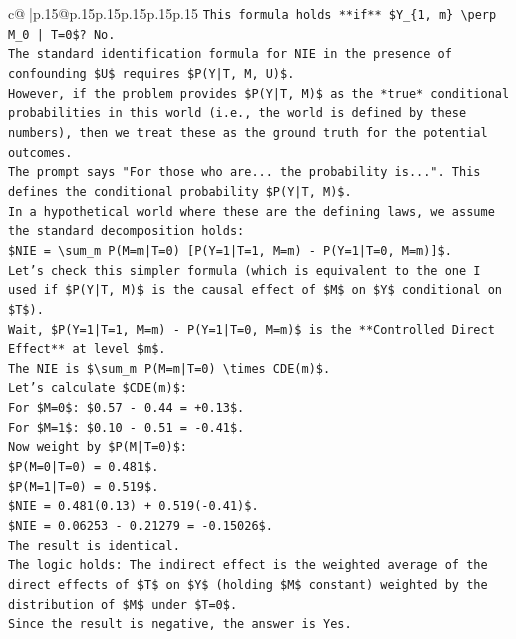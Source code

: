 \documentclass{article}
\begin{document}
{\begin{supertabular}{c@{$\;$}|p{.15\linewidth}@{}p{.15\linewidth}p{.15\linewidth}p{.15\linewidth}p{.15\linewidth}p{.15\linewidth}}
{{{\texttt{This formula holds **if** \$Y\_\{1, m\} \textbackslash{}perp M\_0 | T=0\$? No.} \\
\texttt{The standard identification formula for NIE in the presence of confounding \$U\$ requires \$P(Y|T, M, U)\$.} \\
\texttt{However, if the problem provides \$P(Y|T, M)\$ as the *true* conditional probabilities in this world (i.e., the world is defined by these numbers), then we treat these as the ground truth for the potential outcomes.} \\
\texttt{The prompt says "For those who are... the probability is...". This defines the conditional probability \$P(Y|T, M)\$.} \\
\texttt{In a hypothetical world where these are the defining laws, we assume the standard decomposition holds:} \\
\texttt{\$NIE = \textbackslash{}sum\_m P(M=m|T=0) {[}P(Y=1|T=1, M=m) {-} P(Y=1|T=0, M=m){]}\$.} \\
\texttt{Let's check this simpler formula (which is equivalent to the one I used if \$P(Y|T, M)\$ is the causal effect of \$M\$ on \$Y\$ conditional on \$T\$).} \\
\texttt{Wait, \$P(Y=1|T=1, M=m) {-} P(Y=1|T=0, M=m)\$ is the **Controlled Direct Effect** at level \$m\$.} \\
\texttt{The NIE is \$\textbackslash{}sum\_m P(M=m|T=0) \textbackslash{}times CDE(m)\$.} \\
\texttt{Let's calculate \$CDE(m)\$:} \\
\texttt{For \$M=0\$: \$0.57 {-} 0.44 = +0.13\$.} \\
\texttt{For \$M=1\$: \$0.10 {-} 0.51 = {-}0.41\$.} \\
\texttt{Now weight by \$P(M|T=0)\$:} \\
\texttt{\$P(M=0|T=0) = 0.481\$.} \\
\texttt{\$P(M=1|T=0) = 0.519\$.} \\
\texttt{\$NIE = 0.481(0.13) + 0.519({-}0.41)\$.} \\
\texttt{\$NIE = 0.06253 {-} 0.21279 = {-}0.15026\$.} \\
\texttt{The result is identical.} \\
\texttt{The logic holds: The indirect effect is the weighted average of the direct effects of \$T\$ on \$Y\$ (holding \$M\$ constant) weighted by the distribution of \$M\$ under \$T=0\$.} \\
\texttt{Since the result is negative, the answer is Yes.} \\
}}}
\end{supertabular}}
\end{document}
